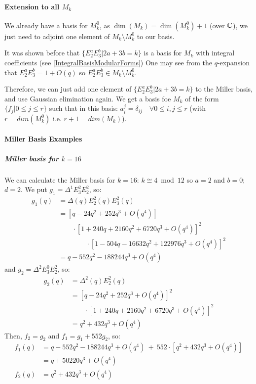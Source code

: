 \paragraph{Extension to all $M_k$}
We already have a basis for $M_k^0$, as $\dim(M_k) = \dim(M_k^0) + 1$ (over $\mathbb{C}$), we just need to adjoint one element of $M_k \setminus M_k^0$ to our basis.

It was shown before that $\{E_2^aE_3^b | 2a+3b=k\}$ is a basis for $M_k$ with integral coefficients (see \ref{IntegralBasisModularForms})
One may see from the $q$-expansion that $E_2^aE_3^b = 1 + O(q)$ so $E_2^aE_3^b \in M_k \setminus M_k^0$.

Therefore, we can just add one element of $\{E_2^aE_3^b | 2a+3b=k\}$ to the Miller basis, and use Gaussian elimination again.
We get a basis foe $M_k$ of the form $\{f_j | 0 \leq j \leq r \}$ such that in this basis: $a_i^j = \delta_{ij} \quad \forall 0 \leq i,j \leq r$ (with $r=dim(M_k^0)$ i.e. $r+1=dim(M_k)$).

\paragraph{Miller Basis Examples}
\subparagraph{Miller basis for $k=16$}
We can calculate the Miller basis for $k=16$:
$k \cong 4 \bmod 12$ so $a=2$ and $b=0$; $d=2$.
We put $g_1 = \Delta^1E_3^2E_2^2$, so:
\begin{align*}
    g_1(q) &= \Delta(q)E_2^2(q)E_3^2(q)\\
           &= \left[ q - 24q^2 + 252q^3 + O(q^4) \right]\\
           & \qquad \cdot \left[ 1 + 240q + 2160q^2 + 6720q^3 + O(q^4) \right]^2\\
           & \qquad \qquad \cdot \left[ 1 - 504q - 16632q^2 + 122976q^3 + O(q^4) \right]^2\\
           &= q - 552q^2 - 188244q^3 + O(q^4)
\end{align*}
and $g_2 = \Delta^2E_3^0E_2^2$, so:
\begin{align*}
    g_2(q) &= \Delta^2(q)E_2^2(q)\\
           &= \left[ q - 24q^2 + 252q^3 + O(q^4) \right]^2\\
           & \qquad \cdot \left[ 1 + 240q + 2160q^2 + 6720q^3 + O(q^4) \right]^2\\
           &= q^2 + 432q^3 + O(q^4)
\end{align*}
Then, $f_2=g_2$ and $f_1=g_1+552g_2$, so:
\begin{align*}
    f_1(q) &= q - 552q^2 - 188244q^3 + O(q^4) \ + \ 552 \cdot \left[q^2 + 432q^3 + O(q^4)\right] \\
           &= q + 50220q^3 + O(q^4)\\
    f_2(q) &= q^2 + 432q^3 + O(q^4)\\
\end{align*}

